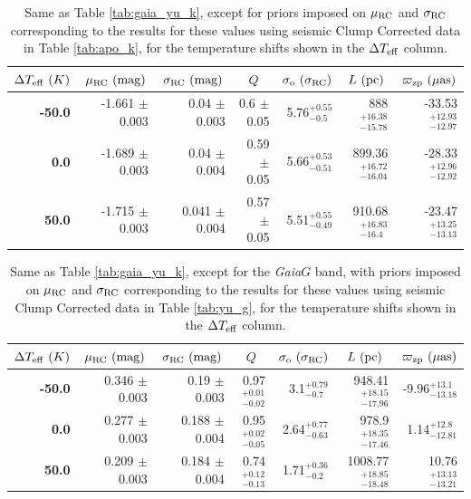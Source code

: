 \documentclass[fleqn,usenatbib]{mnras}
\newcommand{\murc}{\mbox{$\mu_{\rm RC}$}\xspace}
\newcommand{\sigrc}{\mbox{$\sigma_{\rm RC}$}\xspace}
\newcommand{\teff}{\mbox{$T_{\rm eff}$}\xspace}
\newcommand{\gaia}{\emph{Gaia}\xspace}
\begin{document}
\begin{table}
    \begin{tabular}{rrrrrrr}
    \toprule
    \multicolumn{1}{c}{$\Delta T_{\rm eff}\ (K)$} & \multicolumn{1}{c}{$\mu_{\rm RC}\ (\rm mag)$} & \multicolumn{1}{c}{$\sigma_{\rm RC}\ (\rm mag)$}  & \multicolumn{1}{c}{$Q$} &  \multicolumn{1}{c}{$\sigma_{\rm o}\ (\sigma_{\rm RC})$} & \multicolumn{1}{c}{$L\ (\rm pc)$} & \multicolumn{1}{c}{$\varpi_{\rm zp}\ (\mu \rm as)$} \\
    \midrule
        \textbf{-50.0} & -1.661 $\pm$ 0.003 &   0.04 $\pm$ 0.003 &   0.6 $\pm$ 0.05 &  5.76$_{- 0.5}^{+0.55}$   &     888$_{-15.78}^{+16.38}$  & -33.53$_{-12.97}^{+12.93}$\\
        \textbf{0.0  } & -1.689 $\pm$ 0.003 &   0.04 $\pm$ 0.004 &  0.59 $\pm$ 0.05 &  5.66$_{-0.51}^{+0.53}$   &  899.36$_{-16.04}^{+16.72}$  & -28.33$_{-12.92}^{+12.96}$ \\
        \textbf{50.0 } & -1.715 $\pm$ 0.003 &  0.041 $\pm$ 0.004 &  0.57 $\pm$ 0.05 &  5.51$_{-0.49}^{+0.55}$   &  910.68$_{- 16.4}^{+16.83}$  & -23.47$_{-13.13}^{+13.25}$\\
    \bottomrule
    \end{tabular}
\caption{Same as Table \ref{tab:gaia_yu_k}, except for priors imposed on \murc and \sigrc corresponding to the results for these values using seismic Clump Corrected data in Table \ref{tab:apo_k}, for the temperature shifts shown in the $\Delta\teff$ column.}
\label{tab:gaia_apo_k}
\end{table}


\begin{table}
    \begin{tabular}{rrrrrrr}
    \toprule
    \multicolumn{1}{c}{$\Delta T_{\rm eff}\ (K)$} & \multicolumn{1}{c}{$\mu_{\rm RC}\ (\rm mag)$} & \multicolumn{1}{c}{$\sigma_{\rm RC}\ (\rm mag)$}  & \multicolumn{1}{c}{$Q$} &  \multicolumn{1}{c}{$\sigma_{\rm o}\ (\sigma_{\rm RC})$} & \multicolumn{1}{c}{$L\ (\rm pc)$} & \multicolumn{1}{c}{$\varpi_{\rm zp}\ (\mu \rm as)$} \\
    \midrule
        \textbf{-50.0} &  0.346 $\pm$ 0.003 &   0.19 $\pm$ 0.003 &  0.97$_{-0.02}^{+0.01} $ &   3.1$_{- 0.7}^{+0.79}$&   948.41$_{-17.96}^{+18.15}$ &  -9.96$_{-13.18}^{+ 13.1}$\\
        \textbf{0.0  } &  0.277 $\pm$ 0.003 &  0.188 $\pm$ 0.004 &  0.95$_{-0.05}^{+0.02} $ &  2.64$_{-0.63}^{+0.77}$&    978.9$_{-17.46}^{+18.35}$ &   1.14$_{-12.81}^{+ 12.8}$\\
        \textbf{50.0 } &  0.209 $\pm$ 0.003 &  0.184 $\pm$ 0.004 &  0.74$_{-0.13}^{+0.12} $ &  1.71$_{- 0.2}^{+0.36}$&  1008.77$_{-18.48}^{+18.85}$ &  10.76$_{-13.21}^{+13.13}$\\
    \bottomrule
    \end{tabular}
\caption{Same as Table \ref{tab:gaia_yu_k}, except for the \gaia $G$ band, with priors imposed on \murc and \sigrc corresponding to the results for these values using seismic Clump Corrected data in Table \ref{tab:yu_g}, for the temperature shifts shown in the $\Delta\teff$ column.}
\label{tab:gaia_yu_g}
\end{table}
\end{document}
